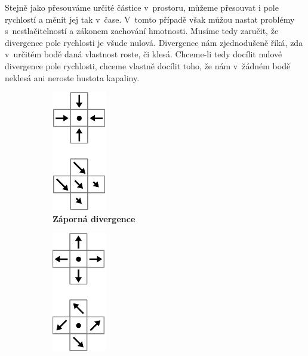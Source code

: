 Stejně jako přesouváme určité částice v~prostoru, můžeme přesouvat i pole rychlostí a měnit jej tak v~čase. V~tomto případě však můžou nastat problémy s~nestlačitelností a zákonem zachování hmotnosti. Musíme tedy zaručit, že divergence pole rychlosti je všude nulová. Divergence nám zjednodušeně říká, zda v~určitém bodě daná vlastnost roste, či klesá. Chceme-li tedy docílit nulové divergence pole rychlosti, chceme vlastně docílit toho, že nám v~žádném bodě neklesá ani neroste hustota kapaliny. \cite{webglFluid}

\begin{figure}[h]
\centering
\begin{subfigure}{.3\textwidth}
  	\centering
	\includegraphics[width=0.35\linewidth]{obrazky-figures/div-negative.png}
	\caption{\textbf{Záporná divergence}}
	\label{fig:Euler}
\end{subfigure}%
\begin{subfigure}{.3\textwidth}
  	\centering
	\includegraphics[width=0.35\linewidth]{obrazky-figures/div-positive.png}

\end{subfigure}
\end{figure}
